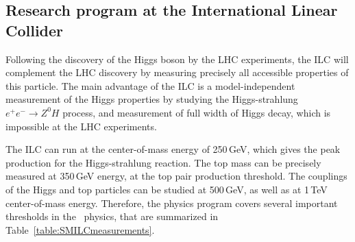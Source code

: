 

\subsection{Research program at the International Linear Collider}

Following the discovery of the Higgs boson by the LHC experiments, the ILC will complement the LHC discovery by measuring precisely all accessible properties of this particle.
The main advantage of the ILC is a model-independent measurement of the Higgs properties by studying  the Higgs-strahlung $e^+e^-\to Z^0H$ process, and measurement of full width of Higgs decay, which is impossible at the LHC experiments. 



The ILC can run at the center-of-mass energy of 250\,GeV, which gives the peak production for the  Higgs-strahlung reaction. 
The top mass can be precisely measured at 350\,GeV energy, at the top pair production threshold. 
The couplings of the Higgs and top particles can be studied at 500\,GeV, as well as at 1\,TeV center-of-mass energy.
Therefore, the physics program covers several important thresholds in the \sm\ physics, that are summarized in Table~\ref{table:SMILCmeasurements}. 

